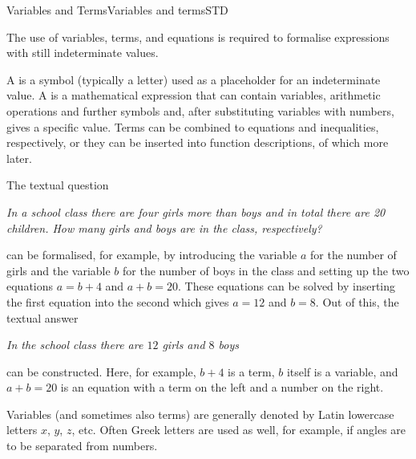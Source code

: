\begin{MXContent}{Variables and Terms}{Variables and terms}{STD}

The use of variables, terms, and equations is required to formalise expressions with 
still indeterminate values.

\begin{MInfo}
A  is a symbol (typically a letter) used as a placeholder for an
indeterminate value. A  is a mathematical expression that can contain variables, arithmetic 
operations and further symbols and, after substituting variables with numbers, gives a specific value. 
Terms can be combined to equations and inequalities, respectively, or they can be inserted into function
descriptions, of which more later.
\end{MInfo}


\begin{MExample}
The textual question 

\textit{In a school class there are four girls more than boys and in total there are 20 children. How many 
girls and boys are in the class, respectively?
}

can be formalised, for example, by introducing the variable $a$ for the number of girls and 
the variable $b$ for the number of boys in the class and setting up the two equations 
$a=b+4$ and $a+b=20$. These equations can be solved by inserting the first equation into 
the second which gives $a=12$ and $b=8$. Out of this, the textual answer 

\textit{In the school class there are $12$ girls and $8$ boys}

can be constructed. Here, for example, $b+4$ is a term, $b$ itself is a variable, and
$a+b=20$ is an equation with a term on the left and a number on the right.
\end{MExample}
Variables (and sometimes also terms) are generally denoted by Latin lowercase letters $x$, $y$, $z$, etc.
Often Greek letters are used as well, for example, if angles are to be separated from numbers.


\end{MXContent}
